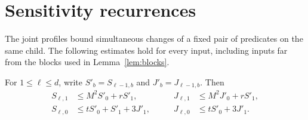 \section{Sensitivity recurrences}
\label{sec:recurrences}

The joint profiles bound simultaneous changes of a fixed pair of predicates
on the same child. The following estimates hold for every input, including
inputs far from the blocks used in Lemma~\ref{lem:blocks}.

\begin{proposition}\label{prop:recurrences}
For $1\leq \ell\leq d$, write
$S'_b=S_{\ell-1,b}$ and $J'_b=J_{\ell-1,b}$.  Then
\begin{equation}\label{eq:recurrences}
\begin{aligned}
 S_{\ell,1}&\leq M^2S'_0+rS'_1,
 &\qquad J_{\ell,1}&\leq M^2J'_0+rS'_1,\\
 S_{\ell,0}&\leq tS'_0+S'_1+3J'_1,
 &\qquad J_{\ell,0}&\leq tS'_0+3J'_1.
\end{aligned}
\end{equation}
\end{proposition}


